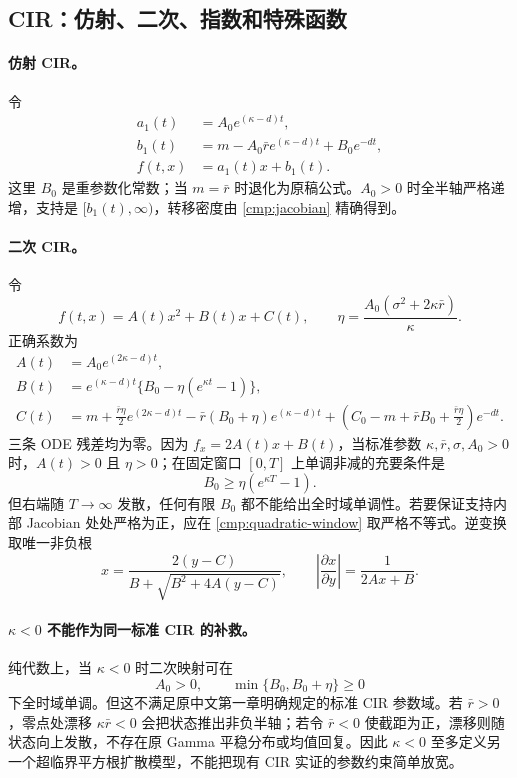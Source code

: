 \documentclass[UTF8,11pt]{ctexart}
\begin{document}
\subsection{CIR：仿射、二次、指数和特殊函数}

\paragraph{仿射 CIR。}
令
\begin{align*}
a_1(t)&=A_0e^{(\kappa-d)t},\\
b_1(t)&=m-A_0\bar r e^{(\kappa-d)t}+B_0e^{-dt},\\
f(t,x)&=a_1(t)x+b_1(t).
\end{align*}
这里 $B_0$ 是重参数化常数；当 $m=\bar r$ 时退化为原稿公式。$A_0>0$ 时全半轴严格递增，支持是 $[b_1(t),\infty)$，转移密度由 \eqref{cmp:jacobian} 精确得到。

\paragraph{二次 CIR。}
令
\[
f(t,x)=A(t)x^2+B(t)x+C(t),\qquad
\eta=\frac{A_0(\sigma^2+2\kappa\bar r)}{\kappa}.
\]
正确系数为
\begin{align*}
A(t)&=A_0e^{(2\kappa-d)t},\\
B(t)&=e^{(\kappa-d)t}\{B_0-\eta(e^{\kappa t}-1)\},\\
C(t)&=m+\frac{\bar r\eta}{2}e^{(2\kappa-d)t}
-\bar r(B_0+\eta)e^{(\kappa-d)t}
+\left(C_0-m+\bar rB_0+\frac{\bar r\eta}{2}\right)e^{-dt}.
\end{align*}
三条 ODE 残差均为零。因为 $f_x=2A(t)x+B(t)$，当标准参数
$\kappa,\bar r,\sigma,A_0>0$ 时，$A(t)>0$ 且 $\eta>0$；在固定窗口 $[0,T]$ 上单调非减的充要条件是
\begin{equation}
B_0\ge\eta(e^{\kappa T}-1).
\label{cmp:quadratic-window}
\end{equation}
但右端随 $T\to\infty$ 发散，任何有限 $B_0$ 都不能给出全时域单调性。若要保证支持内部 Jacobian 处处严格为正，应在 \eqref{cmp:quadratic-window} 取严格不等式。逆变换取唯一非负根
\[
x=\frac{2(y-C)}{B+\sqrt{B^2+4A(y-C)}},
\qquad \left|\frac{\partial x}{\partial y}\right|=\frac1{2Ax+B}.
\]

\paragraph{$\kappa<0$ 不能作为同一标准 CIR 的补救。}
纯代数上，当 $\kappa<0$ 时二次映射可在
\[
A_0>0,\qquad \min\{B_0,B_0+\eta\}\ge0
\]
下全时域单调。但这不满足原中文第一章明确规定的标准 CIR 参数域。若 $\bar r>0$，零点处漂移 $\kappa\bar r<0$ 会把状态推出非负半轴；若令 $\bar r<0$ 使截距为正，漂移则随状态向上发散，不存在原 Gamma 平稳分布或均值回复。因此 $\kappa<0$ 至多定义另一个超临界平方根扩散模型，不能把现有 CIR 实证的参数约束简单放宽。
\end{document}
